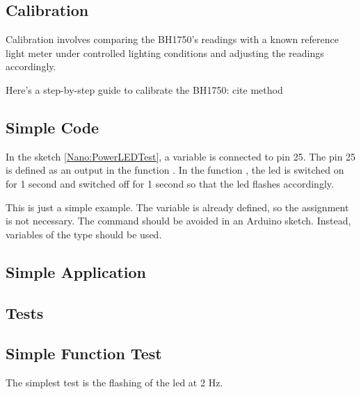 \subsection{Calibration}

Calibration involves comparing the BH1750's readings with a known reference light meter under controlled lighting conditions and adjusting the readings accordingly.

Here’s a step-by-step guide to calibrate the BH1750:
cite method

\subsection{Simple Code}

In the sketch \ref{Nano:PowerLEDTest}, a variable is connected to pin 25. The pin 25 is defined as an output in the function . In the function , the \ac{led} is switched on for 1 second and switched off for 1 second \cite{Lijun:201} so that the \ac{led} flashes accordingly.



{
	\label{Nano:PowerLEDTest}
}

\bigskip

This is just a simple example. The variable  is already defined, so the assignment is not necessary. The command  should be avoided in an Arduino sketch. Instead, variables of the type  should be used.


\subsection{Simple Application}



\subsection{Tests}

\subsection{Simple Function Test}

The simplest test is the flashing of the \ac{led} at 2 Hz.

{
	\label{Nano:PowerLEDTest}
}


